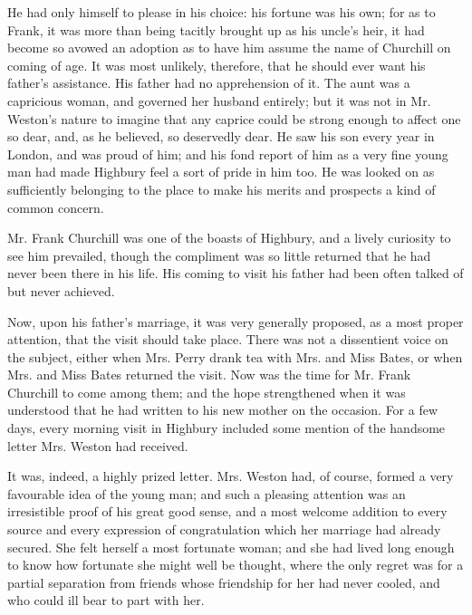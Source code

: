 He had only himself to please in his choice: his fortune was his own; for as to Frank, it was more than being tacitly brought up as his uncle's heir, it had become so avowed an adoption as to have him assume the name of Churchill on coming of age. It was most unlikely, therefore, that he should ever want his father's assistance. His father had no apprehension of it. The aunt was a capricious woman, and governed her husband entirely; but it was not in Mr. Weston's nature to imagine that any caprice could be strong enough to affect one so dear, and, as he believed, so deservedly dear. He saw his son every year in London, and was proud of him; and his fond report of him as a very fine young man had made Highbury feel a sort of pride in him too. He was looked on as sufficiently belonging to the place to make his merits and prospects a kind of common concern.

Mr. Frank Churchill was one of the boasts of Highbury, and a lively curiosity to see him prevailed, though the compliment was so little returned that he had never been there in his life. His coming to visit his father had been often talked of but never achieved.

Now, upon his father's marriage, it was very generally proposed, as a most proper attention, that the visit should take place. There was not a dissentient voice on the subject, either when Mrs. Perry drank tea with Mrs. and Miss Bates, or when Mrs. and Miss Bates returned the visit. Now was the time for Mr. Frank Churchill to come among them; and the hope strengthened when it was understood that he had written to his new mother on the occasion. For a few days, every morning visit in Highbury included some mention of the handsome letter Mrs. Weston had received. 

It was, indeed, a highly prized letter. Mrs. Weston had, of course, formed a very favourable idea of the young man; and such a pleasing attention was an irresistible proof of his great good sense, and a most welcome addition to every source and every expression of congratulation which her marriage had already secured. She felt herself a most fortunate woman; and she had lived long enough to know how fortunate she might well be thought, where the only regret was for a partial separation from friends whose friendship for her had never cooled, and who could ill bear to part with her.

